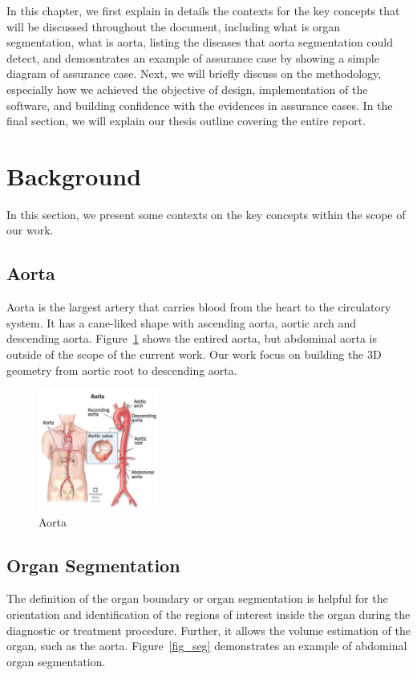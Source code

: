 In this chapter, we first explain in details the contexts for the key concepts that will be discussed throughout the document, including what is organ segmentation, what is aorta, listing the diseases that aorta segmentation could detect, and demosntrates an example of assurance case by showing a simple diagram of assurance case. Next, we will briefly discuss on the methodology, especially how we achieved the objective of design, implementation of the software, and building confidence with the evidences in assurance cases. In the final section, we will explain our thesis outline covering the entire report.

\section{Background} \label{bg}

In this section, we present some contexts on the key concepts within the scope of our work.

\subsection{Aorta}
Aorta is the largest artery that carries blood from the heart to the circulatory system. It has a cane-liked shape with ascending aorta, aortic arch and descending aorta. Figure~\ref{fig_aorta} shows the entired aorta, but abdominal aorta is outside of the scope of the current work. Our work focus on building the 3D geometry from aortic root to descending aorta.

\begin{figure}[ht]
    \centering
    \includegraphics[width=0.35\textwidth]{figures/Intro/Aorta.png}
    \caption[Aorta]{Aorta}
    \label{fig_aorta}
\end{figure}

\subsection{Organ Segmentation}
The definition of the organ boundary or organ segmentation is helpful for the orientation and identification of the regions of interest inside the organ during the diagnostic or treatment procedure. Further, it allows the volume estimation of the organ, such as the aorta. Figure~\ref{fig_seg} demonstrates an example of abdominal organ segmentation.

